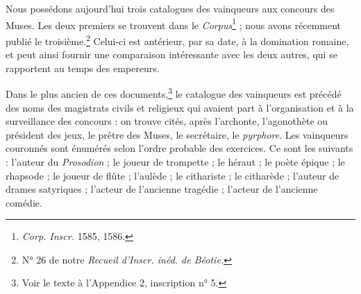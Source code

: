 \documentclass[landscape, a4paper, 11pt, oneside, polutonikogreek, french]{article}
\begin{document}
Nous possédons aujourd'hui trois catalogues des vainqueurs aux concours des Muses. Les deux premiers se trouvent dans le \emph{Corpus}\footnote{\emph{Corp. Inscr.} 1585, 1586.} ; nous avons récemment publié le troisième.\footnote{N° 26 de notre \emph{Recueil d'Inscr. inéd. de Béotie.}} Celui-ci est antérieur, par sa date, à la domination romaine, et peut ainsi fournir une comparaison intéressante avec les deux autres, qui se rapportent au temps des empereurs.

Dans le plus ancien de ces documents,\footnote{Voir le texte à l'Appendice 2, inscription n° 5.} le catalogue des vainqueurs est précédé des noms des magistrats civils et religieux qui avaient part à l'organisation et à la surveillance des concours : on trouve cités, après l'archonte, l'agonothète ou président des jeux, le prêtre des Muses, le secrétaire, le \emph{pyrphore}. Les vainqueurs couronnés sont énumérés selon l'ordre probable des exercices. Ce sont les suivants : l'auteur du \emph{Prosodion} ; le joueur de trompette ; le héraut ; le poète épique ; le rhapsode ; le joueur de flûte ; l'aulède ; le cithariste ; le citharède ; l'auteur de drames satyriques ; l'acteur de l'ancienne tragédie ; l'acteur de l'ancienne comédie.
\end{document}
